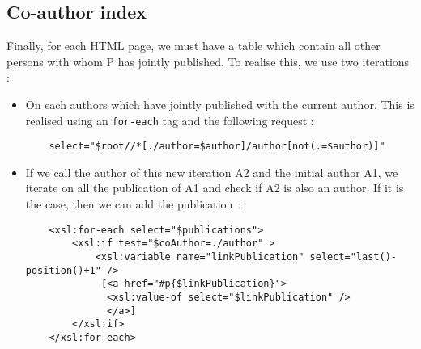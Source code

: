 \documentclass{article}
\begin{document}
\subsection{Co-author index}
Finally, for each HTML page, we must have a table which contain all other persons with whom P has jointly published. To realise this, we use two iterations :
\begin{itemize}
\item On each authors which have jointly published with the current author. This is realised using an \verb|for-each| tag and the following request :
\begin{verbatim}
    select="$root//*[./author=$author]/author[not(.=$author)]"
\end{verbatim}
\item If we call the author of this new iteration A2 and the initial author A1, we iterate on all the publication of A1 and check if A2 is also an author. If it is the case, then we can add the publication~:
\begin{verbatim}
    <xsl:for-each select="$publications">
        <xsl:if test="$coAuthor=./author" >
            <xsl:variable name="linkPublication" select="last()-position()+1" />
             [<a href="#p{$linkPublication}">
              <xsl:value-of select="$linkPublication" />
              </a>]
        </xsl:if>
    </xsl:for-each>
\end{verbatim}
\end{itemize}
\end{document}
